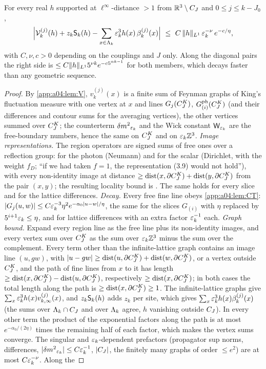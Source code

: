 \begin{lemma}[locality]\label{app:a04:lem:loc}
For every real $h$ supported at $\ell^\infty$-distance $>1$ from $\mathbb R^3\setminus C_J$ and $0\le j\le k-J_0$,
\begin{equation}\label{app:a04:eq:loc}
\Big|\cV^{(j)}_k(h)+z_k\sS_k(h)-\sum_{x\in\Lk}\eps_k^3h(x)\,\beta^{(j)}_k(x)\Big|\ \le\ C\,\norm h_{L^1}\,\eps_k^{-\nu}\,e^{-c/\eta},
\end{equation}
with $C,\nu,c>0$ depending on the couplings and $J$ only. Along the diagonal pairs the right side is $\le C\lVert h\rVert_{L^1}5^{\nu k}e^{-c5^{\alpha k-1}}$ for both members, which decays faster than any geometric sequence.
\end{lemma}
\begin{proof}
By \cref{app:a04:lem:V}, $v^{(j)}_k(x)$ is a finite sum of Feynman graphs of King's fluctuation measure with one vertex \cite[(3.21)]{K1} at $x$ and lines $G_j(C^{K}_{J})$, $G^{\mathrm{ph}}_{(i)}(C^{K}_{J})$ (and their differences and contour sums \cite[(3.27)]{K1} for the averaging vertices), the other vertices summed over $C^{K}_{J}$; the counterterm ${\delta m^2}_{\varepsilon_k}$ and the Wick constant $\mathsf W_{\varepsilon_k}$ are the free-boundary numbers, hence the same on $C^{K}_{J}$ and on $\varepsilon_k\mathbb Z^3$. \emph{Image representations.} The region operators are signed sums of free ones over a reflection group: \cite[(3.7)]{K2} for the photon (Neumann) and \cite[(3.9)]{K2} for the scalar (Dirichlet, with the weight $f_D$; ``if we had taken $f=1$, the representation (3.9) would not hold''), with every non-identity image at distance $\ge\operatorname{dist}(x,\partial C^{K}_{J})+\operatorname{dist}(y,\partial C^{K}_{J})$ from the pair $(x,y)$; the resulting locality bound is \cite[Prop.~5.1, (5.3)]{K2}. The same holds for every slice and for the lattice differences. \emph{Decay.} Every free fine line obeys \cref{app:a04:lem:CT}: $|G_j(u,w)|\le C\varepsilon_k^{-3}\eta^2e^{-\alpha_0|u-w|/\eta}$, the same for the slices $G_{(i)}$ with $\eta$ replaced by $5^{i+1}\varepsilon_k\le\eta$, and for lattice differences with an extra factor $\varepsilon_k^{-1}$ each. \emph{Graph bound.} Expand every region line as the free line plus its non-identity images, and every vertex sum over $C^{K}_{J}$ as the sum over $\varepsilon_k\mathbb Z^3$ minus the sum over the complement. Every term other than the infinite-lattice graph contains an image line $(u,gw)$, with $|u-gw|\ge\operatorname{dist}(u,\partial C^{K}_{J})+\operatorname{dist}(w,\partial C^{K}_{J})$, or a vertex outside $C^{K}_{J}$, and the path of fine lines from $x$ to it has length $\ge\operatorname{dist}(x,\partial C^{K}_{J})-\operatorname{dist}(u,\partial C^{K}_{J})$, respectively $\ge\operatorname{dist}(x,\partial C^{K}_{J})$; in both cases the total length along the path is $\ge\operatorname{dist}(x,\partial C^{K}_{J})\ge1$. The infinite-lattice graphs give $\sum_x\varepsilon_k^3h(x)v^{(j)}_{k,\infty}(x)$, and $z_k\mathsf S_k(h)$ adds $z_k$ per site, which gives $\sum_x\varepsilon_k^3h(x)\beta^{(j)}_k(x)$ (the sums over $\Lambda_k\cap C_J$ and over $\Lambda_k$ agree, $h$ vanishing outside $C_J$). In every other term the product of the exponential factors along the path is at most $e^{-\alpha_0/(2\eta)}$ times the remaining half of each factor, which makes the vertex sums converge. The singular and $\varepsilon_k$-dependent prefactors (propagator sup norms, differences, $|{\delta m^2}_{\varepsilon_k}|\le C\varepsilon_k^{-1}$, $|C_J|$, the finitely many graphs of order $\le e^2$) are at most $C\varepsilon_k^{-\nu}$. Along the 
\end{proof}
